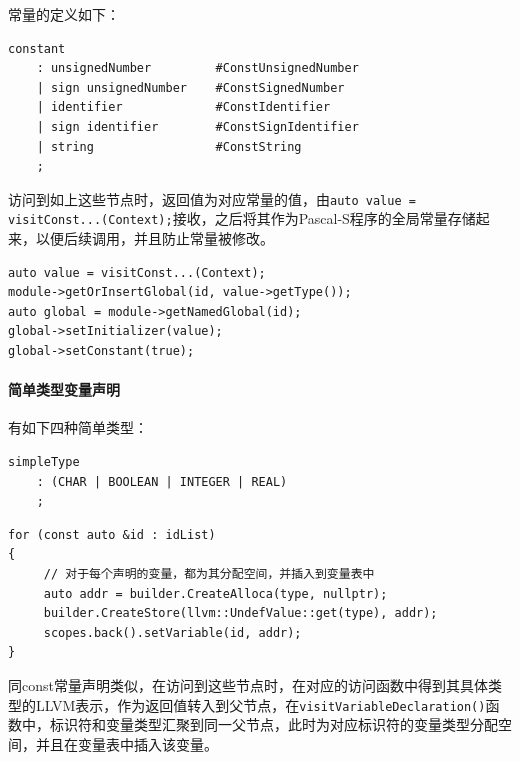 \documentclass[lang=cn,11pt,a4paper,cite=authornum]{paper}
\begin{document}
常量的定义如下：

\begin{code}
\begin{verbatim}
constant
    : unsignedNumber         #ConstUnsignedNumber
    | sign unsignedNumber    #ConstSignedNumber
    | identifier             #ConstIdentifier
    | sign identifier        #ConstSignIdentifier
    | string                 #ConstString
    ;
\end{verbatim}
\end{code}

访问到如上这些节点时，返回值为对应常量的值，由\texttt{auto value = visitConst...(Context);}接收，之后将其作为Pascal-S程序的全局常量存储起来，以便后续调用，并且防止常量被修改。

\begin{code}
\begin{verbatim}
auto value = visitConst...(Context);
module->getOrInsertGlobal(id, value->getType());
auto global = module->getNamedGlobal(id);
global->setInitializer(value);
global->setConstant(true);
\end{verbatim}
\end{code}

\paragraph{简单类型变量声明}

有如下四种简单类型：

\begin{code}
\begin{verbatim}
simpleType
    : (CHAR | BOOLEAN | INTEGER | REAL)
    ;
\end{verbatim}
\end{code}

\begin{code}
\begin{verbatim}
for (const auto &id : idList)
{
     // 对于每个声明的变量，都为其分配空间，并插入到变量表中
     auto addr = builder.CreateAlloca(type, nullptr);
     builder.CreateStore(llvm::UndefValue::get(type), addr);
     scopes.back().setVariable(id, addr);
}
\end{verbatim}
\end{code}

同const常量声明类似，在访问到这些节点时，在对应的访问函数中得到其具体类型的LLVM表示，作为返回值转入到父节点，在\texttt{visitVariableDeclaration()}函数中，标识符和变量类型汇聚到同一父节点，此时为对应标识符的变量类型分配空间，并且在变量表中插入该变量。
\end{document}
